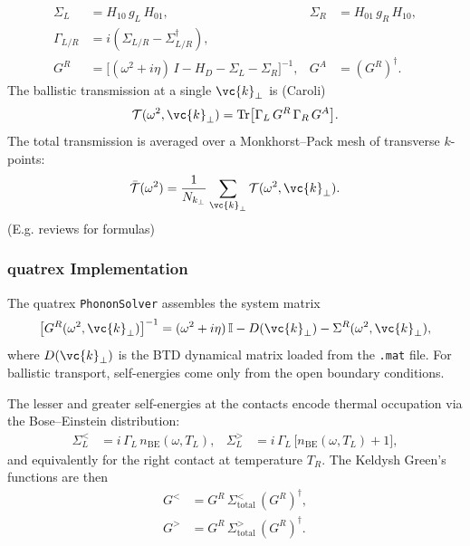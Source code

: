 \begin{align}
  \Sigma_L &= H_{10}\,g_L\,H_{01}, &
  \Sigma_R &= H_{01}\,g_R\,H_{10}, \\
  \Gamma_{L/R} &= i(\Sigma_{L/R} - \Sigma_{L/R}^\dagger), \\
  G^R &= \bigl[(\omega^2 + i\eta)\,I - H_D - \Sigma_L - \Sigma_R\bigr]^{-1}, &
  G^A &= (G^R)^\dagger.
\end{align}
The ballistic transmission at a single $\vc{k}_\perp$ is (Caroli)
\begin{equation}\label{eq:caroli}
  \mathcal{T}(\omega^2, \vc{k}_\perp)
  = \mathrm{Tr}\bigl[\Gamma_L\,G^R\,\Gamma_R\,G^A\bigr].
\end{equation}
The total transmission is averaged over a Monkhorst--Pack mesh of
transverse $k$-points:
\begin{equation}
  \bar{\mathcal{T}}(\omega^2)
  = \frac{1}{N_{k_\perp}} \sum_{\vc{k}_\perp}
    \mathcal{T}(\omega^2, \vc{k}_\perp).
\end{equation}
(E.g. reviews \cite{wang_nonequilibrium_2007, wang_quantum_2008} for formulas)

\subsubsection{quatrex Implementation}
\label{sec:phonon_solver}

The quatrex \texttt{PhononSolver} assembles the system matrix
\begin{equation}\label{eq:system}
  \bigl[G^R(\omega^2, \vc{k}_\perp)\bigr]^{-1}
  = (\omega^2 + i\eta)\,\mathbb{I}
    - D(\vc{k}_\perp) - \Sigma^R(\omega^2, \vc{k}_\perp),
\end{equation}
where $D(\vc{k}_\perp)$ is the BTD dynamical matrix loaded from the
\texttt{.mat} file.  For ballistic transport, self-energies come only from the open boundary conditions.

The lesser and greater self-energies at the contacts encode thermal
occupation via the Bose--Einstein distribution:
\begin{align}
  \Sigma^<_L &= i\,\Gamma_L\,n_\mathrm{BE}(\omega, T_L), &
  \Sigma^>_L &= i\,\Gamma_L\,\bigl[n_\mathrm{BE}(\omega, T_L) + 1\bigr],
\end{align}
and equivalently for the right contact at temperature $T_R$.  The
Keldysh Green's functions are then
\begin{align}
  G^< &= G^R\,\Sigma^<_\mathrm{total}\,(G^R)^\dagger, \\
  G^> &= G^R\,\Sigma^>_\mathrm{total}\,(G^R)^\dagger.
\end{align}

